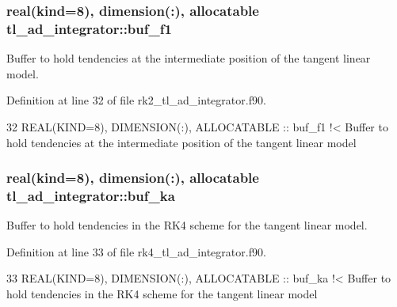 \subsubsection[{\texorpdfstring{buf\+\_\+f1}{buf_f1}}]{\setlength{\rightskip}{0pt plus 5cm}real(kind=8), dimension(\+:), allocatable tl\+\_\+ad\+\_\+integrator\+::buf\+\_\+f1\hspace{0.3cm}{\ttfamily [private]}}\hypertarget{namespacetl__ad__integrator_ac466cd6f698dc9fed5fc3ab46f30b9a5}{}\label{namespacetl__ad__integrator_ac466cd6f698dc9fed5fc3ab46f30b9a5}


Buffer to hold tendencies at the intermediate position of the tangent linear model. 



Definition at line 32 of file rk2\+\_\+tl\+\_\+ad\+\_\+integrator.\+f90.


\begin{DoxyCode}
32   \textcolor{keywordtype}{REAL(KIND=8)}, \textcolor{keywordtype}{DIMENSION(:)}, \textcolor{keywordtype}{ALLOCATABLE} :: buf\_f1\textcolor{comment}{ !< Buffer to hold tendencies at the intermediate
       position of the tangent linear model}
\end{DoxyCode}
\subsubsection[{\texorpdfstring{buf\+\_\+ka}{buf_ka}}]{\setlength{\rightskip}{0pt plus 5cm}real(kind=8), dimension(\+:), allocatable tl\+\_\+ad\+\_\+integrator\+::buf\+\_\+ka\hspace{0.3cm}{\ttfamily [private]}}\hypertarget{namespacetl__ad__integrator_a879cc86c1e268775237b6776a4ff7d32}{}\label{namespacetl__ad__integrator_a879cc86c1e268775237b6776a4ff7d32}


Buffer to hold tendencies in the R\+K4 scheme for the tangent linear model. 



Definition at line 33 of file rk4\+\_\+tl\+\_\+ad\+\_\+integrator.\+f90.


\begin{DoxyCode}
33   \textcolor{keywordtype}{REAL(KIND=8)}, \textcolor{keywordtype}{DIMENSION(:)}, \textcolor{keywordtype}{ALLOCATABLE} :: buf\_ka\textcolor{comment}{ !< Buffer to hold tendencies in the RK4 scheme for the
       tangent linear model}
\end{DoxyCode}
